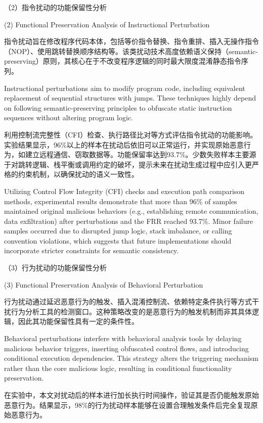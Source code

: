 （2）指令扰动的功能保留性分析

(2) Functional Preservation Analysis of Instructional Perturbation

指令扰动旨在修改程序代码本体，包括等价指令替换、指令重排、插入无操作指令（NOP）、使用跳转替换顺序结构等。该类扰动技术高度依赖语义保持（semantic-preserving）原则，其核心在于不改变程序逻辑的同时最大限度混淆静态指令序列。

Instructional perturbations aim to modify program code, including equivalent replacement of sequential structures with jumps. These techniques highly depend on following semantic-preserving principles to obfuscate static instruction sequences without altering program logic.

利用控制流完整性（CFI）检查、执行路径比对等方式评估指令扰动的功能影响。实验结果显示，96\%以上的样本在扰动后依旧可以正常运行，并实现原始恶意行为，如建立远程通信、窃取数据等。功能保留率达到93.7\%。少数失败样本主要源于对跳转逻辑、栈平衡或调用约定的破坏，提示未来在扰动生成过程中应引入更严格的约束机制，以确保扰动的语义一致性。

Utilizing Control Flow Integrity (CFI) checks and execution path comparison methods, experimental results demonstrate that more than 96\% of samples maintained original malicious behaviors (e.g., establishing remote communication, data exfiltration) after perturbations and the FRR reached 93.7\%. Minor failure samples occurred due to disrupted jump logic, stack imbalance, or calling convention violations, which suggests that future implementations should incorporate stricter constraints for semantic consistency.

（3）行为扰动的功能保留性分析

(3) Functional Preservation Analysis of Behavioral Perturbation

行为扰动通过延迟恶意行为的触发、插入混淆控制流、依赖特定条件执行等方式干扰行为分析工具的检测窗口。这种策略改变的是恶意行为的触发机制而非其具体逻辑，因此其功能保留性具有一定的条件性。

Behavioral perturbations interfere with behavioral analysis tools by delaying malicious behavior triggers, inserting obfuscated control flows, and introducing conditional execution dependencies. This strategy alters the triggering mechanism rather than the core malicious logic, resulting in conditional functionality preservation.

在实验中，本文对扰动后的样本进行加长执行时间操作，验证其是否仍能触发原始恶意行为。结果显示，98\%的行为扰动样本能够在设置合理触发条件后完全复现原始恶意行为。


